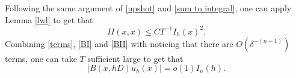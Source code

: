 \documentclass[12pt,reqno]{amsart}
\numberwithin{equation}{section}
\begin{document}
Following the same argument of \eqref{upshot} and \eqref{sum to integral}, one can apply Lemma \ref{lwl} to get that
\begin{equation}\label{BII}
II(x,x) \leq C T^{-1} I_h(x)^2.
\end{equation}
Combining \eqref{terms}, \eqref{BI} and \eqref{BII} with  noticing that there are $O(\delta^{-(n-1)})$ terms, one can take $T$ sufficient large to get that
\begin{equation}
    |B(x, hD)u_h(x)|=o(1)I_n(h).
\end{equation}





\end{document}
